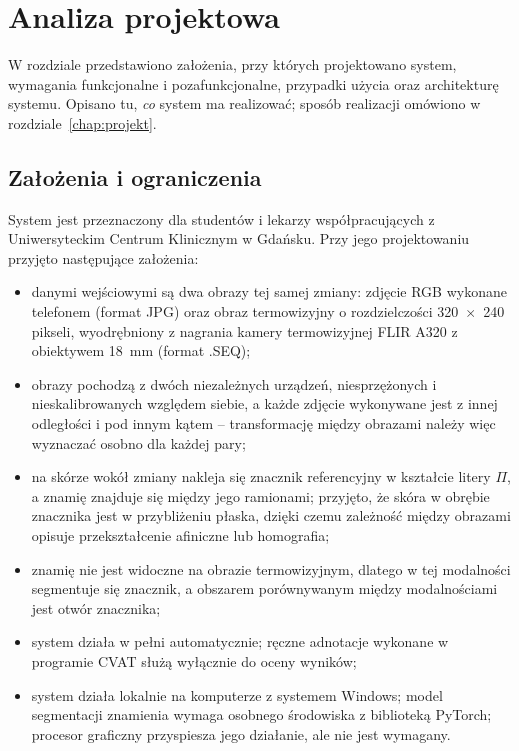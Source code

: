 
\chapter{Analiza projektowa}
\label{chap:analiza}

W rozdziale przedstawiono założenia, przy których projektowano system, wymagania funkcjonalne i pozafunkcjonalne, przypadki użycia oraz architekturę systemu. Opisano tu, \emph{co} system ma realizować; sposób realizacji omówiono w rozdziale~\ref{chap:projekt}.

\section{Założenia i ograniczenia}
\label{sec:zalozenia}

System jest przeznaczony dla studentów i lekarzy współpracujących z Uniwersyteckim Centrum Klinicznym w Gdańsku. %
Przy jego projektowaniu przyjęto następujące założenia:
\begin{itemize}
  \item danymi wejściowymi są dwa obrazy tej samej zmiany: zdjęcie RGB wykonane telefonem (format JPG) oraz obraz termowizyjny o rozdzielczości 320~$\times$~240 pikseli, wyodrębniony z nagrania kamery termowizyjnej FLIR A320 z obiektywem 18~mm (format .SEQ);
  \item obrazy pochodzą z dwóch niezależnych urządzeń, niesprzężonych i nieskalibrowanych względem siebie, a każde zdjęcie wykonywane jest z innej odległości i pod innym kątem -- transformację między obrazami należy więc wyznaczać osobno dla każdej pary;
  \item na skórze wokół zmiany nakleja się znacznik referencyjny w kształcie litery $\Pi$, a znamię znajduje się między jego ramionami; przyjęto, że skóra w obrębie znacznika jest w przybliżeniu płaska, dzięki czemu zależność między obrazami opisuje przekształcenie afiniczne lub homografia;
  \item znamię nie jest widoczne na obrazie termowizyjnym, dlatego w tej modalności segmentuje się znacznik, a obszarem porównywanym między modalnościami jest otwór znacznika;
  \item system działa w pełni automatycznie; ręczne adnotacje wykonane w programie CVAT służą wyłącznie do oceny wyników;
  \item system działa lokalnie na komputerze z systemem Windows; model segmentacji znamienia wymaga osobnego środowiska z biblioteką PyTorch; procesor graficzny przyspiesza jego działanie, ale nie jest wymagany.
\end{itemize}

